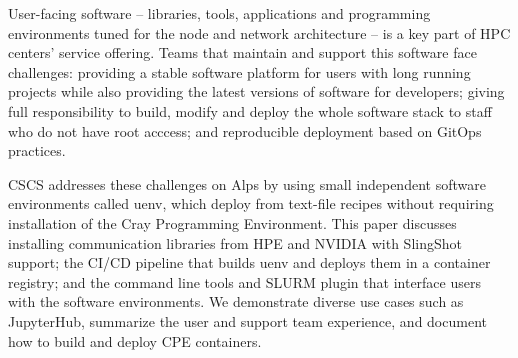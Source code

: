 User-facing software -- libraries, tools, applications and programming environments tuned for the node and network architecture -- is a key part of HPC centers' service offering. Teams that maintain and support this software face challenges: providing a stable software platform for users with long running projects while also providing the latest versions of software for developers; giving full responsibility to build, modify and deploy the whole software stack to staff who do not have root acccess; and reproducible deployment based on GitOps practices.

CSCS addresses these challenges on Alps by using small independent software environments called uenv, which deploy from text-file recipes without requiring installation of the Cray Programming Environment. This paper discusses installing communication libraries from HPE and NVIDIA with SlingShot support; the CI/CD pipeline that builds uenv and deploys them in a container registry; and the command line tools and SLURM plugin that interface users with the software environments. We demonstrate diverse use cases such as JupyterHub, summarize the user and support team experience, and document how to build and deploy CPE containers.

